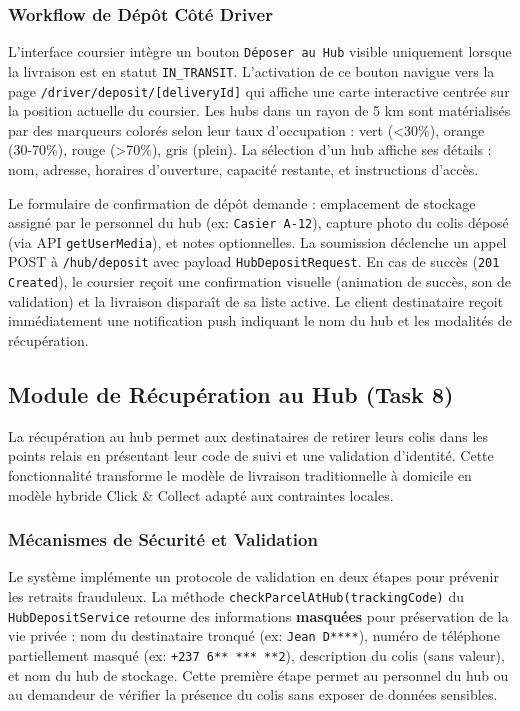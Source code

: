 \subsubsection{Workflow de Dépôt Côté Driver}

L'interface coursier intègre un bouton \texttt{Déposer au Hub} visible uniquement lorsque la livraison est en statut \texttt{IN\_TRANSIT}. L'activation de ce bouton navigue vers la page \texttt{/driver/deposit/[deliveryId]} qui affiche une carte interactive centrée sur la position actuelle du coursier. Les hubs dans un rayon de 5 km sont matérialisés par des marqueurs colorés selon leur taux d'occupation : vert (\textless 30\%), orange (30-70\%), rouge (\textgreater 70\%), gris (plein). La sélection d'un hub affiche ses détails : nom, adresse, horaires d'ouverture, capacité restante, et instructions d'accès.

Le formulaire de confirmation de dépôt demande : emplacement de stockage assigné par le personnel du hub (ex: \texttt{Casier A-12}), capture photo du colis déposé (via API \texttt{getUserMedia}), et notes optionnelles. La soumission déclenche un appel POST à \texttt{/hub/deposit} avec payload \texttt{HubDepositRequest}. En cas de succès (\texttt{201 Created}), le coursier reçoit une confirmation visuelle (animation de succès, son de validation) et la livraison disparaît de sa liste active. Le client destinataire reçoit immédiatement une notification push indiquant le nom du hub et les modalités de récupération.

\subsection{Module de Récupération au Hub (Task 8)}

La récupération au hub permet aux destinataires de retirer leurs colis dans les points relais en présentant leur code de suivi et une validation d'identité. Cette fonctionnalité transforme le modèle de livraison traditionnelle à domicile en modèle hybride Click \& Collect adapté aux contraintes locales.

\subsubsection{Mécanismes de Sécurité et Validation}

Le système implémente un protocole de validation en deux étapes pour prévenir les retraits frauduleux. La méthode \texttt{checkParcelAtHub(trackingCode)} du \texttt{HubDepositService} retourne des informations \textbf{masquées} pour préservation de la vie privée : nom du destinataire tronqué (ex: \texttt{Jean D****}), numéro de téléphone partiellement masqué (ex: \texttt{+237 6** *** **2}), description du colis (sans valeur), et nom du hub de stockage. Cette première étape permet au personnel du hub ou au demandeur de vérifier la présence du colis sans exposer de données sensibles.


